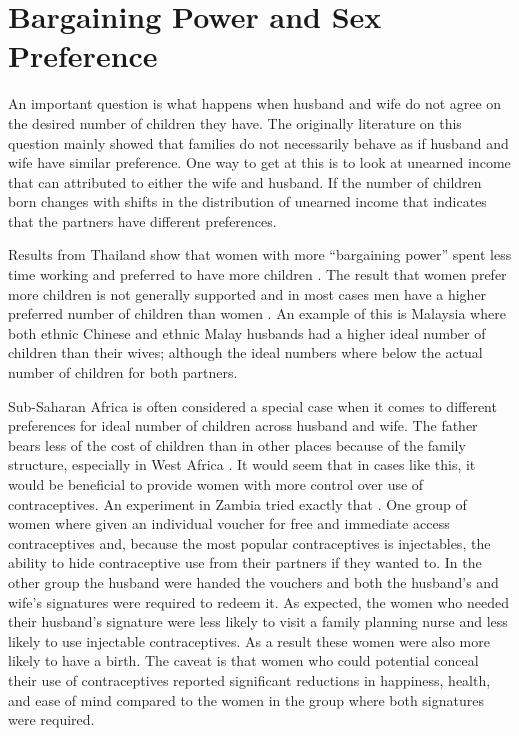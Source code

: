 \documentclass[]{article}
\begin{document}
\section{Bargaining Power and Sex Preference}\label{bargaining-power-and-sex-preference}

An important question is what happens when husband and wife do not agree on the desired number of children they have. The originally literature on this question mainly showed that families do not necessarily behave as if husband and wife have similar preference. One way to get at this is to look at unearned income that can attributed to either the wife and husband. If the number of children born changes with shifts in the distribution of unearned income that indicates that the partners have different preferences.

Results from Thailand show that women with more ``bargaining power'' spent less time working and preferred to have more children \citep{Schultz1990}. The result that women prefer more children is not generally supported and in most cases men have a higher preferred number of children than women \citep{Westoff2010}. An example of this is Malaysia where both ethnic Chinese and ethnic Malay husbands had a higher ideal number of children than their wives; although the ideal numbers where below the actual number of children for both partners\citep{Rasul2008}.

Sub-Saharan Africa is often considered a special case when it comes to different preferences for ideal number of children across husband and wife. The father bears less of the cost of children than in other places because of the family structure, especially in West Africa \citep{Caldwell1992}. It would seem that in cases like this, it would be beneficial to provide women with more control over use of contraceptives. An experiment in Zambia tried exactly that \citep{Ashraf2014}. One group of women where given an individual voucher for free and immediate access contraceptives and, because the most popular contraceptives is injectables, the ability to hide contraceptive use from their partners if they wanted to. In the other group the husband were handed the vouchers and both the husband's and wife's signatures were required to redeem it. As expected, the women who needed their husband's signature were less likely to visit a family planning nurse and less likely to use injectable contraceptives. As a result these women were also more likely to have a birth. The caveat is that women who could potential conceal their use of contraceptives reported significant reductions in happiness, health, and ease of mind compared to the women in the group where both signatures were required.
\end{document}
